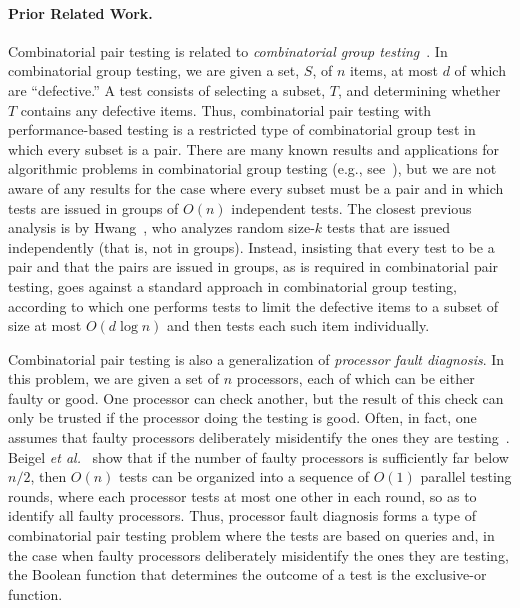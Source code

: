 \documentclass[11pt]{llncs}
\renewcommand{\subsection}[1]{\paragraph{\bf #1.}}
\begin{document}
\subsection{Prior Related Work}
Combinatorial pair testing
is related to \emph{combinatorial group testing}~\cite{du2000}. 
In combinatorial group testing, we are given a set, $S$, of $n$ items,
at most $d$ of which are ``defective.''
A test consists of selecting a subset, $T$, and determining whether $T$ contains any defective items.
Thus, combinatorial pair testing with performance-based testing is a 
restricted type of combinatorial group test in which every subset is a pair.
There are many known results and applications for algorithmic problems
in combinatorial group testing
(e.g., see~\cite{du2000,Eppstein:2006,gat-iidf-05}), 
but we are not aware 
of any results for the case where every subset must be a pair and in which tests
are issued in groups of $O(n)$ independent tests.
The closest previous analysis is by Hwang~\cite{Hwang:2000}, 
who analyzes random size-$k$ tests that are issued independently 
(that is, not in groups).
Instead, insisting that every test to be a pair and that the pairs
are issued in groups, as is required
in combinatorial pair testing, goes against a standard 
approach in combinatorial group testing, according to which one performs tests to limit 
the defective items
to a subset of size at most $O(d\log n)$ and then tests each such item
individually.

Combinatorial pair testing is also a generalization of
\emph{processor fault diagnosis}. In this problem,
we are given a set of $n$ processors, each of which can be 
either faulty or good. One processor can check another, but the
result of this check can only be trusted if the
processor doing the testing is good.
Often, in fact, one assumes that faulty processors deliberately misidentify
the ones they are testing~\cite{Blecher1983107,Pelc:1998}.
Beigel {\it et al.}~\cite{bhk-95,Beigel:1989,Beigel:1993} 
show that if the number of faulty
processors is sufficiently far below $n/2$, then
$O(n)$ tests can be organized into
a sequence of $O(1)$ parallel testing rounds, where each processor tests at most one
other in each round, so as to identify all faulty processors.
Thus, processor fault diagnosis forms a type of
combinatorial pair testing problem where the tests are
based on queries and, in the case when faulty processors deliberately
misidentify the ones they are testing, the Boolean function that determines the outcome of a test is the exclusive-or function.
\end{document}
